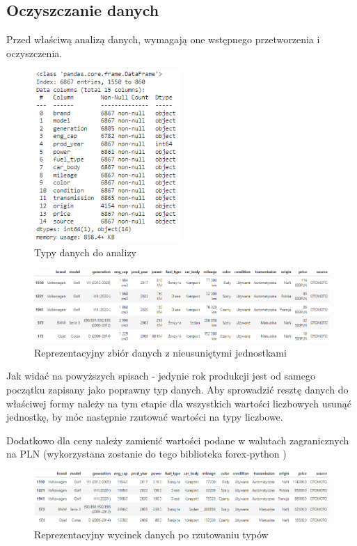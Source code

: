 \documentclass{article}
\begin{document}
\subsection{Oczyszczanie danych}
Przed właściwą analizą danych, wymagają one wstępnego przetworzenia i oczyszczenia.

\begin{figure}[H]
    \centering
    \includegraphics[width=0.5\textwidth]{images/typy_danych_w_dataframe.png}
    \caption{Typy danych do analizy}
\end{figure}

\begin{figure}[H]
    \centering
    \includegraphics[width=1\linewidth]{images/reprezentacyjne_wartosci_z_jednostkami.png}
    \caption{Reprezentacyjny zbiór danych z nieusuniętymi jednostkami}
\end{figure}

Jak widać na powyższych spisach - jedynie rok produkcji jest od samego początku zapisany jako poprawny typ danych. Aby sprowadzić resztę danych do właściwej formy należy na tym etapie dla wszystkich wartości liczbowych usunąć jednostkę, by móc następnie rzutować wartości na typy liczbowe.

Dodatkowo dla ceny należy zamienić wartości podane w walutach zagranicznych na PLN (wykorzystana zostanie do tego biblioteka forex-python \cite{forex_python})

\begin{figure}[H]
    \centering
    \includegraphics[width=1\linewidth]{images/reprezentacyjny_wycinek_danych_bez_jednostek.png}
    \caption{Reprezentacyjny wycinek danych po rzutowaniu typów}
\end{figure}
\end{document}
